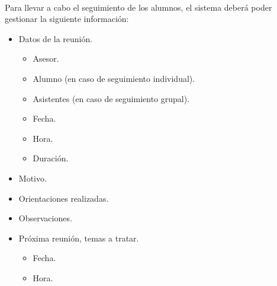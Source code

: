 \paragraph{}Para llevar a cabo el seguimiento de los alumnos, el sistema deberá
poder gestionar la siguiente información:

\begin{itemize}
   \item Datos de la reunión.
   \begin{itemize}
      \item Asesor.
      \item Alumno (en caso de seguimiento individual).
      \item Asistentes (en caso de seguimiento grupal).
      \item Fecha.
      \item Hora.
      \item Duración.
   \end{itemize}
   \item Motivo.
   \item Orientaciones realizadas.
   \item Observaciones.
   \item Próxima reunión, temas a tratar.
   \begin{itemize}
      \item Fecha.
      \item Hora.
   \end{itemize}
\end{itemize}
